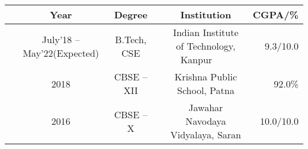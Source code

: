 
\newcommand{\education}[4]{
  & #1 & #2 & &#3 & #4
}
{
\fontsize{10pt}{1em}\selectfont
\begin{tabular}{ | L{0.05cm} c | c | L{0.2cm} c | r |}
  \hline
  \rule{0pt}{1.1\normalbaselineskip}
  \education{\textbf{Year}}{\textbf{Degree}}{\textbf{Institution}}{\textbf{CGPA/\%}}\\
  \hline
  \rule{0pt}{1.1\normalbaselineskip}
  \education{July'18 -- May'22(Expected)}{B.Tech, CSE}{Indian Institute of Technology, Kanpur~~~~}{9.3/10.0}\\
  \rule{0pt}{1.1\normalbaselineskip}
  \education{2018}{CBSE -- XII}{Krishna Public School, Patna}{92.0\%}\\
  \rule{0pt}{1.1\normalbaselineskip}
  \education{2016}{CBSE -- X}{Jawahar Navodaya Vidyalaya, Saran}{10.0/10.0}\\
  \hline
\end{tabular}

}